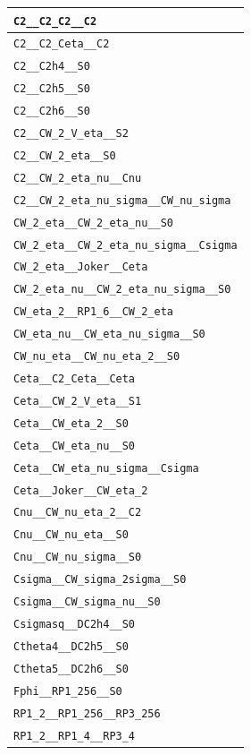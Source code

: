 \documentclass{amsart}
\numberwithin{equation}{section}
\begin{document}
\begin{table}
\begin{tabular}{|l|}\hline
\verb|C2__C2_C2__C2|\\\hline
\verb|C2__C2_Ceta__C2|\\\hline
\verb|C2__C2h4__S0|\\\hline
\verb|C2__C2h5__S0|\\\hline
\verb|C2__C2h6__S0|\\\hline
\verb|C2__CW_2_V_eta__S2|\\\hline
\verb|C2__CW_2_eta__S0|\\\hline
\verb|C2__CW_2_eta_nu__Cnu|\\\hline
\verb|C2__CW_2_eta_nu_sigma__CW_nu_sigma|\\\hline
\verb|CW_2_eta__CW_2_eta_nu__S0|\\\hline
\verb|CW_2_eta__CW_2_eta_nu_sigma__Csigma|\\\hline
\verb|CW_2_eta__Joker__Ceta|\\\hline
\verb|CW_2_eta_nu__CW_2_eta_nu_sigma__S0|\\\hline
\verb|CW_eta_2__RP1_6__CW_2_eta|\\\hline
\verb|CW_eta_nu__CW_eta_nu_sigma__S0|\\\hline
\verb|CW_nu_eta__CW_nu_eta_2__S0|\\\hline
\verb|Ceta__C2_Ceta__Ceta|\\\hline
\verb|Ceta__CW_2_V_eta__S1|\\\hline
\verb|Ceta__CW_eta_2__S0|\\\hline
\verb|Ceta__CW_eta_nu__S0|\\\hline
\verb|Ceta__CW_eta_nu_sigma__Csigma|\\\hline
\verb|Ceta__Joker__CW_eta_2|\\\hline
\verb|Cnu__CW_nu_eta_2__C2|\\\hline
\verb|Cnu__CW_nu_eta__S0|\\\hline
\verb|Cnu__CW_nu_sigma__S0|\\\hline
\verb|Csigma__CW_sigma_2sigma__S0|\\\hline
\verb|Csigma__CW_sigma_nu__S0|\\\hline
\verb|Csigmasq__DC2h4__S0|\\\hline
\verb|Ctheta4__DC2h5__S0|\\\hline
\verb|Ctheta5__DC2h6__S0|\\\hline
\verb|Fphi__RP1_256__S0|\\\hline
\verb|RP1_2__RP1_256__RP3_256|\\\hline
\verb|RP1_2__RP1_4__RP3_4|\\\hline

\end{tabular}
\end{table}
\end{document}
